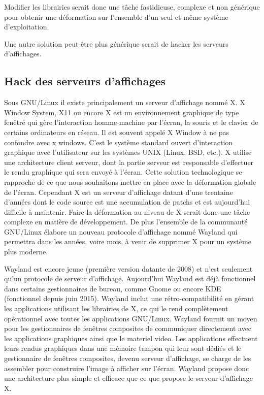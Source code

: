 Modifier les librairies serait donc une tâche fastidieuse, complexe et non générique pour obtenir une déformation sur l'ensemble d'un seul et même système d'exploitation.

Une autre solution peut-être plus générique serait de hacker les serveurs d'affichages.

\subsection{Hack des serveurs d'affichages}

Sous GNU/Linux il existe principalement un serveur d'affichage nommé X. X Window System, X11 ou encore X est un environnement graphique de type fenêtré qui gère l'interaction homme-machine par l'écran, la souris et le clavier de certains ordinateurs en réseau. Il est souvent appelé X Window à ne pas confondre avec x windows. C'est le système standard ouvert d'interaction graphique avec l'utilisateur sur les systèmes UNIX (Linux, BSD, etc.). X utilise une architecture client serveur, dont la partie serveur est responsable d'effectuer le rendu graphique qui sera envoyé à l'écran. Cette solution technologique se rapproche de ce que nous souhaitons mettre en place avec la déformation globale de l'écran. Cependant X est un serveur d'affichage datant d'une trentaine d'années dont le code source est une accumulation de patchs et est aujourd'hui difficile à maintenir. Faire la déformation au niveau de X serait donc une tâche complexe en matière de développement. De plus l'ensemble de la communauté GNU/Linux élabore un nouveau protocole d'affichage nommé Wayland qui permettra dans les années, voire mois, à venir de supprimer X pour un système plus moderne. 

Wayland est encore jeune (première version datante de 2008) et n'est seulement qu'un protocole de serveur d'affichage. Aujourd'hui Wayland est déjà fonctionnel dans certains gestionnaires de bureau, comme Gnome ou encore KDE (fonctionnel depuis juin 2015). Wayland inclut une rétro-compatibilité en gérant les applications utilisant les librairies de X, ce qui le rend complètement opérationnel avec toutes les applications GNU/Linux. Wayland fournit un moyen pour les gestionnaires de fenêtres composites de communiquer directement avec les applications graphiques ainsi que le materiel video. Les applications effectuent leurs rendus graphiques dans une mémoire tampon qui leur sont dédiés et le gestionnaire de fenêtres composites, devenu serveur d’affichage, se charge de les assembler pour construire l’image à afficher sur l’écran. Wayland propose donc une architecture plus simple et efficace que ce que propose le serveur d’affichage X. 

